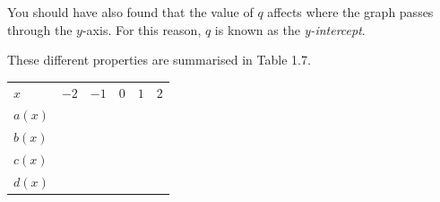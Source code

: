         \label{m39338*id238136}You should have also found that the value of $q$ affects where the graph passes through the $y$-axis. For this reason, $q$ is known as the \textsl{y-intercept}.\par 
        \label{m39338*id238175}These different properties are summarised in Table 1.7.\par 
          \begin{table}[H]
        \begin{center}
      \label{m39345*id240930}
    \noindent
      \tablelasttail{}
      \begin{xtabular}[t]{|l|l|l|l|l|l|}\hline
                  $x$
                 &
                  $-2$
                 &
                  $-1$
                 &
                  $0$
                 &
                  $1$
                 &
                  $2$
     \tabularnewline{}
                  $a\left(x\right)$
                 &
         &
         &
         &
         &
     \tabularnewline{}
                  $b\left(x\right)$
                 &
         &
         &
         &
         &
     \tabularnewline{}
                  $c\left(x\right)$
                 &
         &
         &
         &
         &
     \tabularnewline{}
                  $d\left(x\right)$
                 &
         &
         &
         &
         &
     \tabularnewline{}

\end{xtabular}
\end{center}
\end{table}
